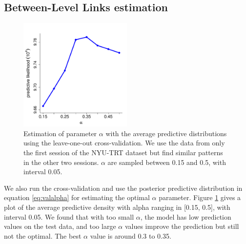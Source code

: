 \documentclass[review,authoryear]{elsarticle}
\begin{document}
\subsection{Between-Level Links estimation}
\begin{figure}[htb]
  \centering
  \includegraphics[width=0.5\textwidth]{figures/alpha/predictLLvsAlpha}
  \caption{Estimation of parameter $\alpha$ with the average predictive
    distributions using the leave-one-out cross-validation. We use the data from
    only the first session of the NYU-TRT dataset but find similar patterns in
    the other two sessions. $\alpha$ are sampled between 0.15 and 0.5, with
    interval 0.05.}
  \label{fig:alphaest}
\end{figure}

We also run the cross-validation and use the posterior predictive distribution
in equation \eqref{eq:valalpha} for estimating the optimal $\alpha$
parameter. Figure \ref{fig:alphaest} gives a plot of the average predictive
density with alpha ranging in [0.15, 0.5], with interval 0.05. We found that with
too small $\alpha$, the model has low prediction values on the test data, and
too large $\alpha$ values improve the prediction but still not the optimal. The
best $\alpha$ value is around 0.3 to 0.35.
\end{document}

